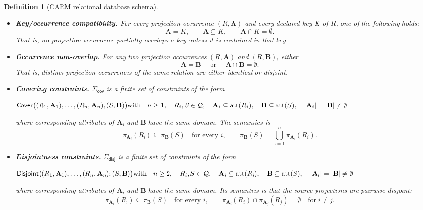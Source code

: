 \documentclass[10pt]{article}
\newtheorem{definition}{Definition}
\begin{document}
\begin{definition}[\textsf{CARM} relational database schema]
\begin{itemize}
\item \textbf{Key/occurrence compatibility.}
For every projection occurrence \((R,\mathbf A)\) and every declared key \(K\) of
\(R\), one of the following holds:
\[
\mathbf A = K,
\qquad
\mathbf A \subsetneq K,
\qquad
\mathbf A \cap K = \emptyset.
\]
That is, no projection occurrence partially overlaps a key unless it is
contained in that key.

\item \textbf{Occurrence non-overlap.}
For any two projection occurrences \((R,\mathbf A)\) and
\((R,\mathbf B)\), either
\[
\mathbf A=\mathbf B\quad \text{ or }\quad\mathbf A\cap\mathbf B=\emptyset.
\]
That is, distinct projection occurrences of the same relation are either
identical or disjoint.

\item \textbf{Covering constraints.}
\(\Sigma_{\mathsf{cov}}\) is a finite set of constraints of the form

\(
\mathsf{Cover}
\bigl((R_1,\mathbf A_1),\ldots,(R_n,\mathbf A_n);
(S,\mathbf B)\bigr)\\
\text{with}\quad
n\geq 1,\quad R_i,S\in\mathcal Q,\quad
\mathbf A_i\subseteq \operatorname{att}(R_i),\quad
\mathbf B\subseteq \operatorname{att}(S),\quad
|\mathbf A_i|=|\mathbf B|\neq\emptyset
\)

where corresponding attributes of \(\mathbf A_i\) and \(\mathbf B\) have
the same domain.  The semantics is
\[
\pi_{\mathbf A_i}(R_i)\subseteq \pi_{\mathbf B}(S)
\quad\text{for every }i,
\qquad
\pi_{\mathbf B}(S)
=
\bigcup_{i=1}^n \pi_{\mathbf A_i}(R_i).
\]

\item \textbf{Disjointness constraints.}
\(\Sigma_{\mathsf{disj}}\) is a finite set of constraints of the form

\(
\mathsf{Disjoint}
\bigl((R_1,\mathbf A_1),\ldots,(R_n,\mathbf A_n);
(S,\mathbf B)\bigr)\\
\text{with}\quad
n\geq 2,\quad R_i,S\in\mathcal Q,\quad
\mathbf A_i\subseteq \operatorname{att}(R_i),\quad
\mathbf B\subseteq \operatorname{att}(S),\quad
|\mathbf A_i|=|\mathbf B|\neq\emptyset
\)

where corresponding attributes of \(\mathbf A_i\) and \(\mathbf B\) have
the same domain.  Its semantics is that the source projections
are pairwise disjoint:
\[
\pi_{\mathbf A_i}(R_i)\subseteq \pi_{\mathbf B}(S)
\quad\text{for every }i,
\qquad
\pi_{\mathbf A_i}(R_i)\cap \pi_{\mathbf A_j}(R_j)=\emptyset
\quad\text{for } i\neq j.
\]


\end{itemize}
\end{definition}
\end{document}
